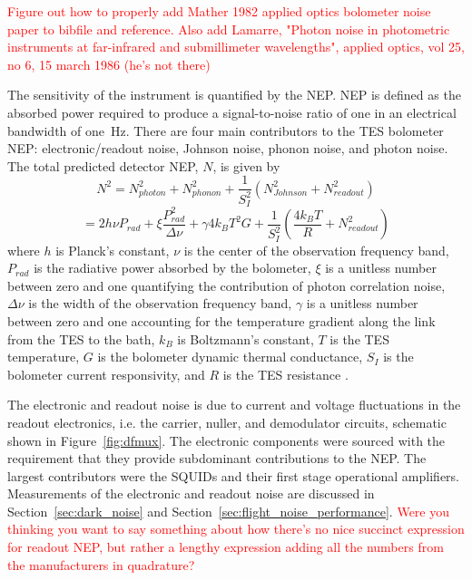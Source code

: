 \textcolor{red}{Figure out how to properly add Mather 1982 applied optics bolometer noise paper to bibfile and reference. Also add Lamarre, "Photon noise in photometric instruments at far-infrared and submillimeter wavelengths", applied optics, vol 25, no 6, 15 march 1986 (he's not there)}


The sensitivity of the instrument is quantified by the \ac{NEP}. 
\ac{NEP} is defined as the absorbed power required to produce a signal-to-noise ratio of one in an electrical bandwidth of one~Hz. 
There are four main contributors to the \ac{TES} bolometer \ac{NEP}: electronic/readout noise, Johnson noise, phonon noise, and photon noise. 
The total predicted detector \ac{NEP}, $N$, is given by 
\begin{equation}
N^{2} = N_{photon}^2 + N_{phonon}^2 + \frac{1}{S_I^2} ( N_{Johnson}^2 + N_{readout}^2 )
\end{equation}
\begin{equation}
= 2h\nu P_{rad} + \xi \frac{P_{rad}^2}{\Delta \nu} + \gamma 4k_{B} T^2 G + \frac{1}{S_I^2} (\frac{4k_{B}T}{R} + N_{readout}^2 )
\label{eq:nep}
\end{equation}
where $h$ is Planck's constant, $\nu$ is the center of the observation frequency band, $P_{rad}$ is the radiative power absorbed by the bolometer, $\xi$ is a unitless number between zero and one quantifying the contribution of photon correlation noise, $\Delta \nu$ is the width of the observation frequency band, $\gamma$ is a unitless number between zero and one accounting for the temperature gradient along the link from the \ac{TES} to the bath, $k_{B}$ is Boltzmann's constant, $T$ is the \ac{TES} temperature, $G$ is the bolometer dynamic thermal conductance, $S_{I}$ is the bolometer current responsivity, and $R$ is the \ac{TES} resistance \citep{Mather1982a}. 

The electronic and readout noise is due to current and voltage fluctuations in the readout electronics, i.e. the carrier, nuller, and demodulator circuits, schematic shown in Figure~\ref{fig:dfmux}. 
The electronic components were sourced with the requirement that they provide subdominant contributions to the \ac{NEP}. 
The largest contributors were the \ac{SQUID}s and their first stage operational amplifiers. 
Measurements of the electronic and readout noise are discussed in Section~\ref{sec:dark_noise} and Section~\ref{sec:flight_noise_performance}.
\textcolor{red}{Were you thinking you want to say something about how there's no nice succinct expression for readout \ac{NEP}, but rather a lengthy expression adding all the numbers from the manufacturers in quadrature?}

